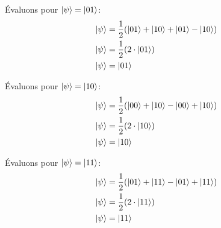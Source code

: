 \documentclass{article}
\begin{document}
Évaluons pour $\ket{\psi} = \ket{01}$: \\
\begin{align*}
    \ket{\psi} &= \frac{1}{2}(\ket{01} + \ket{10} + \ket{01} - \ket{10}) \\
    \ket{\psi} &= \frac{1}{2}(2\cdot\ket{01}) \\
    \ket{\psi} &= \ket{01}
\end{align*}

Évaluons pour $\ket{\psi} = \ket{10}$: \\
\begin{align*}
    \ket{\psi} &= \frac{1}{2}(\ket{00} + \ket{10} - \ket{00} + \ket{10}) \\
    \ket{\psi} &= \frac{1}{2}(2\cdot\ket{10}) \\
    \ket{\psi} &= \ket{10}
\end{align*}

Évaluons pour $\ket{\psi} = \ket{11}$: \\
\begin{align*}
    \ket{\psi} &= \frac{1}{2}(\ket{01} + \ket{11} - \ket{01} + \ket{11}) \\
    \ket{\psi} &= \frac{1}{2}(2\cdot\ket{11}) \\
    \ket{\psi} &= \ket{11}
\end{align*}
\end{document}
